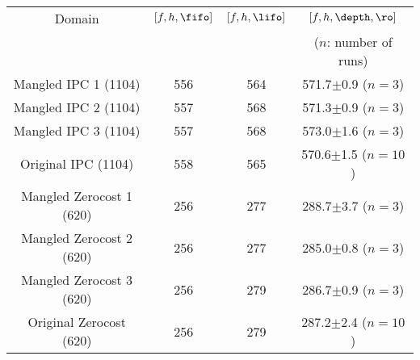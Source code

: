 \begin{tabular}{|c|c|c||c|}
\hline         
 Domain & $[f,h,\fifo]$ & $[f,h,\lifo]$ & $[f,h,\depth,\ro]$    \\
        &               &               & ($n$: number of runs) \\
\hline         
 Mangled IPC 1 (1104) &  556 &  564 &  571.7$\pm$0.9 ($n=3$)\\\hline
 Mangled IPC 2 (1104) &  557 &  568 &  571.3$\pm$0.9 ($n=3$)\\\hline
 Mangled IPC 3 (1104) &  557 &  568 &  573.0$\pm$1.6 ($n=3$)\\\hline
 Original IPC (1104) &  558 &  565 &  570.6$\pm$1.5 ($n=10$)\\\hline
 Mangled Zerocost 1 (620) &  256 &  277 &  288.7$\pm$3.7 ($n=3$)\\\hline
 Mangled Zerocost 2 (620) &  256 &  277 &  285.0$\pm$0.8 ($n=3$)\\\hline
 Mangled Zerocost 3 (620) &  256 &  279 &  286.7$\pm$0.9 ($n=3$)\\\hline
 Original Zerocost  (620) &  256 &  279 &  287.2$\pm$2.4 ($n=10$)\\\hline
\end{tabular}
